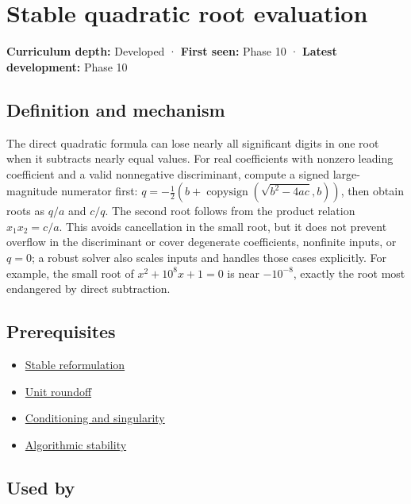 \hypertarget{appendix-b9afba7f63e5}{}\label{referencestart:appendix-b9afba7f63e5}
\section{Stable quadratic root evaluation}\label{appendix-b9afba7f63e5-stable-quadratic-root-evaluation}

\textbf{Curriculum depth:} Developed · \textbf{First seen:} Phase 10 · \textbf{Latest development:} Phase 10

\subsection{Definition and mechanism}\label{appendix-b9afba7f63e5-definition-and-mechanism}

The direct quadratic formula can lose nearly all significant digits in one root when it subtracts nearly equal values. For real coefficients with nonzero leading coefficient and a valid nonnegative discriminant, compute a signed large-magnitude numerator first: \(q=-\frac12(b+\operatorname{copysign}(\sqrt{b^2-4ac},b))\), then obtain roots as \(q/a\) and \(c/q\). The second root follows from the product relation \(x_1x_2=c/a\). This avoids cancellation in the small root, but it does not prevent overflow in the discriminant or cover degenerate coefficients, nonfinite inputs, or \(q=0\); a robust solver also scales inputs and handles those cases explicitly. For example, the small root of \(x^2+10^8x+1=0\) is near \(-10^{-8}\), exactly the root most endangered by direct subtraction.

\subsection{Prerequisites}\label{appendix-b9afba7f63e5-prerequisites}

\begin{itemize}
\tightlist
\item
  \hyperref[appendix-d7f8ba961670]{Stable reformulation}
\item
  \hyperref[appendix-bc44f7b42f42]{Unit roundoff}
\item
  \hyperref[appendix-8f6a01f284a7]{Conditioning and singularity}
\item
  \hyperref[appendix-aa2bf0d79639]{Algorithmic stability}
\end{itemize}

\subsection{Used by}\label{appendix-b9afba7f63e5-used-by}

